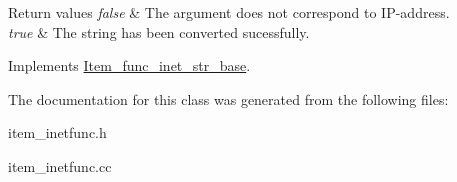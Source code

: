\begin{DoxyRetVals}{Return values}
{\em false} & The argument does not correspond to IP-\/address. \\
\hline
{\em true} & The string has been converted sucessfully. \\
\hline
\end{DoxyRetVals}


Implements \mbox{\hyperlink{classItem__func__inet__str__base}{Item\+\_\+func\+\_\+inet\+\_\+str\+\_\+base}}.



The documentation for this class was generated from the following files\+:\begin{DoxyCompactItemize}
\item 
item\+\_\+inetfunc.\+h\item 
item\+\_\+inetfunc.\+cc\end{DoxyCompactItemize}
